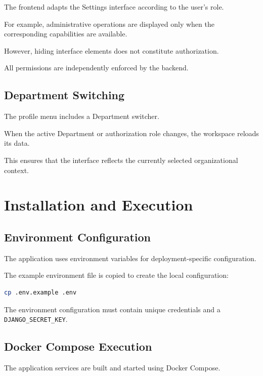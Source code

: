 \documentclass[11pt,a4paper]{article}
\begin{document}
The frontend adapts the Settings
interface according to the user's role.

For example, administrative operations
are displayed only when the corresponding
capabilities are available.

However, hiding interface elements
does not constitute authorization.

All permissions are independently
enforced by the backend.

\subsection{Department Switching}

The profile menu includes a
Department switcher.

When the active Department or
authorization role changes,
the workspace reloads its data.

This ensures that the interface
reflects the currently selected
organizational context.


\section{Installation and Execution}

\subsection{Environment Configuration}

The application uses environment variables
for deployment-specific configuration.

The example environment file is copied
to create the local configuration:

\begin{lstlisting}[language=bash]
cp .env.example .env
\end{lstlisting}

The environment configuration must contain
unique credentials and a
\texttt{DJANGO\_SECRET\_KEY}.

\subsection{Docker Compose Execution}

The application services are built
and started using Docker Compose.
\end{document}
